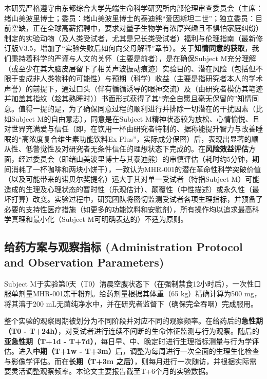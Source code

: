 本研究严格遵守由东都综合大学先端生命科学研究所内部伦理审查委员会（主席：绪山美波里博士；委员：绪山美波里博士的泰迪熊“爱因斯坦二世”；独立委员：目前空缺，正在全球高薪招聘中，要求对量子生物学有浓厚兴趣且不惧怕家庭纠纷）制定的实验动物（及人类受试者，尤其是兄长类受试者）福利与伦理指南（最新修订版V3.5，增加了“实验失败后如何向父母解释”章节）。关于\textbf{知情同意的获取}，我们秉持着科学的严谨与人文的关怀（主要是前者），是在确保Subject M充分理解（或至少在其大脑皮层留下了相关声波振动痕迹）实验目的、潜在风险（包括但不限于变成非人类物种的可能性）与预期（科学）收益（主要是指研究者本人的学术声誉）的前提下，通过口头（伴有循循诱导的眼神交流）及（由研究者模仿其笔迹并加盖其指纹（趁其熟睡时））书面形式获得了其“完全自愿且毫无保留的”知情同意。值得一提的是，为了确保同意过程的顺利进行并排除一切潜在的干扰因素（比如Subject M的自由意志），同意是在Subject M精神状态较为放松、心情愉悦、且对世界充满爱与信任（即，在饮用一杯由研究者特制的、据称能提升智力与改善睡眠的“高浓度复合维生素功能饮料Ex Plus”，实际成分保密）后，表现出显著的顺从性、低警觉性及对研究者无条件信任的理想状态下完成的。在\textbf{风险效益评估}方面，经过委员会（即绪山美波里博士与其泰迪熊）的审慎评估（耗时约5分钟，期间消耗了一杯咖啡和两块小饼干），一致认为MHR-001的潜在革命性科学突破价值（以及可能带来的诺贝尔奖提名）远大于其对单一受试者（特指Subject M）可能造成的生理及心理状态的暂时性（乐观估计）、颠覆性（中性描述）或永久性（最坏打算）改变。实验过程中，研究团队将密切监测受试者各项生理指标，并预备了必要的支持性医疗措施（如更多的功能饮料和安慰剂），所有操作均以追求最高科学真理和最小化（Subject M可明确表达的）不适为原则。

\subsection{给药方案与观察指标 (Administration Protocol and Observation Parameters)}

Subject M于实验第0天（T0）清晨空腹状态下（在强制禁食12小时后），一次性口服单剂量MHR-001冻干粉剂。给药剂量根据其体重（65 kg）精确计算为500 mg，将其溶于200 mL无菌纯净水中，并在研究者监督下（确保完全吞咽）完成服用。

整个实验的观察周期被划分为不同阶段并对应不同的观察频率。在给药后的\textbf{急性期（T0 - T+24h）}，对受试者进行连续不间断的生命体征监测与行为观察。随后的\textbf{亚急性期（T+1d - T+7d）}，每日早、中、晚定时进行生理指标测量与行为学评估。进入\textbf{中期（T+1w - T+3m）}后，调整为每周进行一次全面的生理生化检查与影像学评估。而在\textbf{长期（T+3m 之后）}，则每月进行一次随访，并根据实际需要灵活调整观察频率。本论文主要报告截至T+6个月的实验数据。

